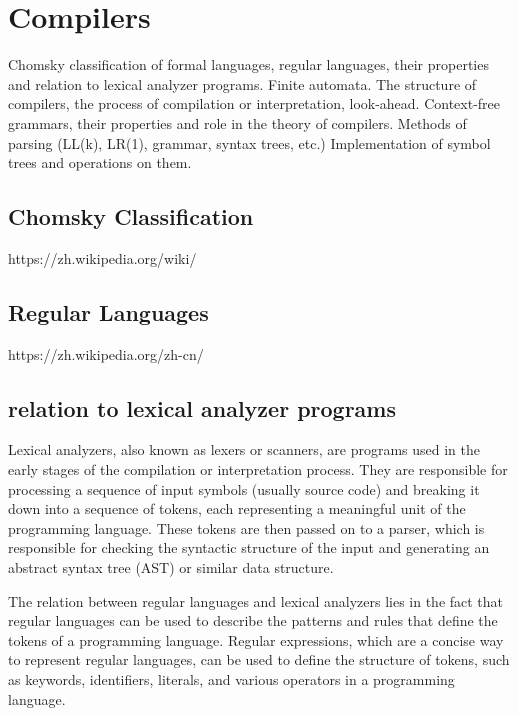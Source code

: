 \documentclass{article}
\begin{document}
\section{Compilers}

Chomsky classification of formal languages, regular languages, their properties and relation to lexical analyzer programs. Finite automata. The structure of compilers, the process of compilation or interpretation, look-ahead. Context-free grammars, their properties and role in the theory of compilers. Methods of parsing (LL(k), LR(1), grammar, syntax trees, etc.) Implementation of symbol trees and operations on them.


\subsection{Chomsky Classification}

https://zh.wikipedia.org/wiki/%


\subsection{Regular Languages}

https://zh.wikipedia.org/zh-cn/%


\subsection{relation to lexical analyzer programs}

Lexical analyzers, also known as lexers or scanners, are programs used in the early stages of the compilation or interpretation process. They are responsible for processing a sequence of input symbols (usually source code) and breaking it down into a sequence of tokens, each representing a meaningful unit of the programming language. These tokens are then passed on to a parser, which is responsible for checking the syntactic structure of the input and generating an abstract syntax tree (AST) or similar data structure.

The relation between regular languages and lexical analyzers lies in the fact that regular languages can be used to describe the patterns and rules that define the tokens of a programming language. Regular expressions, which are a concise way to represent regular languages, can be used to define the structure of tokens, such as keywords, identifiers, literals, and various operators in a programming language.
\end{document}
